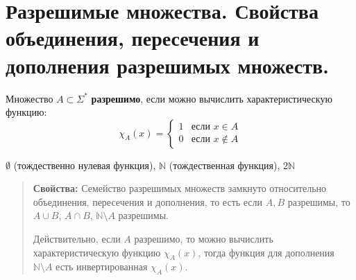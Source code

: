 \section{Разрешимые множества. Свойства объединения, пересечения и дополнения разрешимых множеств.}
\begin{definition} Множество $A \subset \Sigma^*$ \textbf{разрешимо}, если можно вычислить характеристическую функцию: \begin{equation*}
\chi_{A}(x) = 
 \begin{cases}
   1 &\text{если $x \in A$}\\
   0 &\text{если $x \notin A$}
 \end{cases}
\end{equation*}
\end{definition}
\begin{example}
$\emptyset$ (тождественно нулевая функция), $\mathbb{N}$ (тождественная функция), $2\mathbb{N}$
\end{example}


\begin{quote} {\textbf{Свойства: }}
Семейство разрешимых множеств замкнуто относительно объединения, пересечения и дополнения, то есть если $A, B$ разрешимы, то $A \cup B$, $A \cap B$, $\mathbb{N} \setminus A$ разрешимы.
\par Действительно, если $A$ разрешимо, то можно вычислить характеристическую функцию $\chi_{A}(x)$, тогда функция для дополнения $\mathbb{N} \setminus A$ есть инвертированная $\chi_{A}(x)$.
\end{quote}